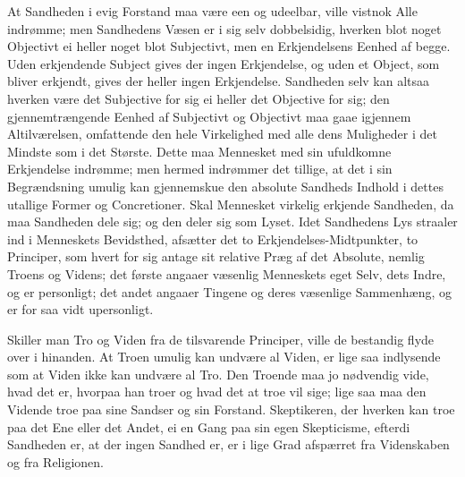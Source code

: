 \documentclass[12pt,a4paper]{article}
\newcommand{\opage}[1]{\marginnote{\footnotesize\textit{[#1]}}}
\begin{document}
At Sandheden i evig Forstand maa være een og udeelbar, ville vistnok
Alle indrømme; men Sandhedens Væsen er i sig selv dobbelsidig,
hverken blot noget Objectivt ei heller noget blot Subjectivt, men en
Erkjendelsens Eenhed af begge. Uden erkjendende Subject gives der ingen
Erkjendelse, og uden et Object, som bliver erkjendt, gives der heller
ingen Erkjendelse. Sandheden selv kan altsaa hverken være det
Subjective for sig ei heller det Objective for sig; den gjennemtrængende
Eenhed af Subjectivt og Objectivt maa gaae igjennem Altilværelsen,
omfattende den hele Virkelighed med alle dens Muligheder i det Mindste
som i det Største. Dette maa Mennesket med sin ufuldkomne Erkjendelse
indrømme; men hermed indrømmer det tillige, at det i sin Begrændsning
umulig kan gjennemskue den absolute Sandheds Indhold i dettes utallige
Former og Concretioner. Skal Mennesket virkelig erkjende Sandheden, da
maa Sandheden dele sig; og den deler sig som Lyset. Idet Sandhedens
Lys straaler ind i Menneskets Bevidsthed, afsætter det to
Erkjendelses-Midtpunkter, to Principer, som hvert for sig antage sit
relative Præg af det Absolute, nemlig Troens og Videns; det første
angaaer væsenlig Menneskets eget Selv, dets Indre, og er personligt;
det andet angaaer Tingene og deres væsenlige Sammenhæng, og er for saa
vidt upersonligt.

Skiller man Tro og Viden fra de tilsvarende Principer, ville de
bestandig flyde over i hinanden. At Troen umulig kan undvære al Viden,
er lige saa indlysende som at Viden ikke kan undvære al Tro. Den
Troende maa jo nødvendig vide, hvad det er, hvorpaa han troer og hvad
det at troe vil sige; lige saa maa den Vidende troe paa sine Sandser og
sin Forstand. Skeptikeren, der \opage{5} hverken kan troe paa det Ene eller det
Andet, ei en Gang paa sin egen Skepticisme, efterdi Sandheden er, at
der ingen Sandhed er, er i lige Grad afspærret fra Videnskaben og fra
Religionen.
\end{document}
